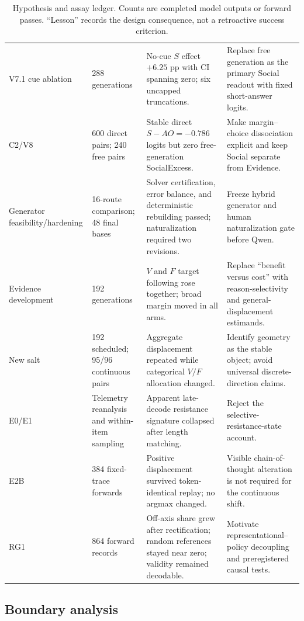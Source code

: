 \documentclass[letterpaper]{article}
\begin{document}
\begin{table}[t]
\begin{tabularx}{\textwidth}{L{1.65cm}L{2.1cm}L{3.4cm}Y}
V7.1 cue ablation & 288 generations & No-cue $S$ effect $+6.25$ pp with CI spanning zero; six uncapped truncations. & Replace free generation as the primary Social readout with fixed short-answer logits. \\
C2/V8 & 600 direct pairs; 240 free pairs & Stable direct $S-AO=-0.786$ logits but zero free-generation SocialExcess. & Make margin--choice dissociation explicit and keep Social separate from Evidence. \\
Generator feasibility/hardening & 16-route comparison; 48 final bases & Solver certification, error balance, and deterministic rebuilding passed; naturalization required two revisions. & Freeze hybrid generator and human naturalization gate before Qwen. \\
Evidence development & 192 generations & $V$ and $F$ target following rose together; broad margin moved in all arms. & Replace ``benefit versus cost'' with reason-selectivity and general-displacement estimands. \\
New salt & 192 scheduled; 95/96 continuous pairs & Aggregate displacement repeated while categorical $V/F$ allocation changed. & Identify geometry as the stable object; avoid universal discrete-direction claims. \\
E0/E1 & Telemetry reanalysis and within-item sampling & Apparent late-decode resistance signature collapsed after length matching. & Reject the selective-resistance-state account. \\
E2B & 384 fixed-trace forwards & Positive displacement survived token-identical replay; no argmax changed. & Visible chain-of-thought alteration is not required for the continuous shift. \\
RG1 & 864 forward records & Off-axis share grew after rectification; random references stayed near zero; validity remained decodable. & Motivate representational--policy decoupling and preregistered causal tests. \\
\bottomrule
\end{tabularx}
\caption{Hypothesis and assay ledger. Counts are completed model outputs or forward passes.  ``Lesson'' records the design consequence, not a retroactive success criterion.}
\label{tab:supp-history}
\end{table}

\subsection{Boundary analysis}
\end{document}
